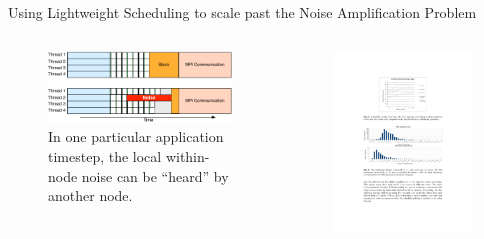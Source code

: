 \documentclass[serif,mathserif,final]{beamer}
\begin{document}
\begin{frame}{}
\begin{columns}[t]
\begin{column}{0.33\linewidth}
      \begin{block}{\small Using Lightweight Scheduling to scale past the Noise Amplification Problem}  
       \begin{columns}[t]
         \begin{column}{0.5\columnwidth}
           \begin{figure}[htb]
             \centering
             \includegraphics[width=0.9\columnwidth]{images/dynamic-schedule}
           \caption{ \tiny  In one particular application timestep, the 
              local within-node noise can be ``heard'' 
               by another node. } 
           \end{figure}
         \end{column} 
      \begin{column}{0.5\columnwidth}
        \begin{figure}[htb] 
          \centering 
          \includegraphics[width=.9\columnwidth]{images/uSched-scaling}
          \caption{  } 
        \end{figure} 
      \end{column} 


\end{columns}
\end{block}
\end{column}
\end{columns}
\end{frame}
\end{document}
